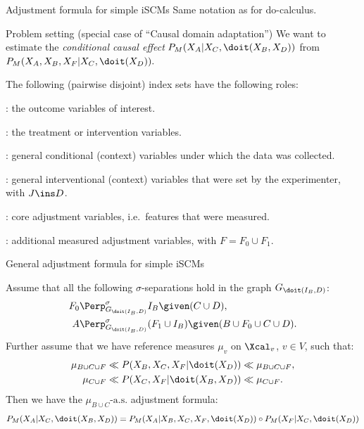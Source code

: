 \begin{frame}{Adjustment formula for simple iSCMs}
Same notation as for do-calculus.
  \begin{block}{Problem setting (special case of ``Causal domain adaptation'')}
We want to estimate the \emph{conditional causal effect}
$P_{M}(X_A|X_C,\doit(X_B,X_D))$
from
$P_{M}(X_A,X_B,X_F|X_C,\doit(X_D)).$
\end{block}
The following (pairwise disjoint) index sets have the following roles:\\
\begin{description}\small
  \item[$A\ins V$]: the outcome variables of interest.
  \item[$B\ins V$]: the treatment or intervention variables.
  \item[$C\ins V$]: general conditional (context) variables under which the data was collected.
  \item[$J\ins D\ins V \cup J$]: general interventional (context) variables that were set by the experimenter, with $J \ins D$.
  \item[$F_0\ins V$]: core adjustment variables, i.e.\ features that were measured.
  \item[$F_1\ins V$]: additional measured adjustment variables, with $F = F_0 \cup F_1$.
\end{description}
\end{frame}

\begin{frame}{General adjustment formula for simple iSCMs}
  \begin{Thm}[\ref{thm:gen-adjustment-scms}]
    \small
Assume that all the following $\sigma$-separations hold in the graph $G_{\doit(I_B,D)}$:
    \begin{align*}
        F_0 & \Perp^\sigma_{G_{\doit(I_B,D)}} I_B \given (C \cup D), \\
        A & \Perp^\sigma_{G_{\doit(I_B,D)}} (F_1 \cup I_B) \given (B \cup F_0 \cup C \cup D).
    \end{align*}
Further assume that we have reference measures $\mu_v$ on $\Xcal_v$, $v \in V$, such that:
  \begin{align*}
      \mu_{B \cup C \cup F} &\ll  P(X_B,X_C,X_F|\doit(X_D)) \ll \mu_{B \cup C \cup F},\\
      \mu_{C \cup F} &\ll  P(X_C,X_F|\doit(X_B,X_D)) \ll \mu_{C \cup F}.
  \end{align*}
Then we have the $\mu_{B \cup C}\text{-a.s.}$ adjustment formula:
      \[ P_{M}(X_A|X_C,\doit(X_B,X_D)) = P_{M}(X_A|X_B,X_C,X_F,\doit(X_D)) \circ P_{M}(X_F|X_C,\doit(X_D)) \]
\end{Thm}
\end{frame}

